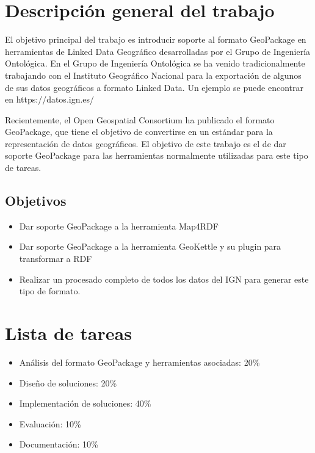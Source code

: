 \documentclass[11pt]{article}
\begin{document}
\maketitle
\tableofcontents
\newpage

\section{Descripción general del trabajo}
El objetivo principal del trabajo es introducir soporte al formato GeoPackage en herramientas de Linked Data
Geográfico desarrolladas por el Grupo de Ingeniería Ontológica.
En el Grupo de Ingeniería Ontológica se ha venido tradicionalmente trabajando con el Instituto Geográfico Nacional para la exportación de algunos de sus datos geográficos a formato Linked Data. Un ejemplo se puede encontrar en https://datos.ign.es/

Recientemente, el Open Geospatial Consortium ha publicado el formato GeoPackage, que tiene el objetivo de convertirse en un estándar para la representación de datos geográficos. El objetivo de este trabajo es el de dar soporte GeoPackage para las herramientas normalmente utilizadas para este tipo de tareas.

\subsection{Objetivos}
\begin{itemize}
    \item Dar soporte GeoPackage a la herramienta Map4RDF
    \item Dar soporte GeoPackage a la herramienta GeoKettle y su plugin para transformar a RDF
    \item Realizar un procesado completo de todos los datos del IGN para generar este tipo de formato.
\end{itemize}

\section{Lista de tareas}
\begin{itemize}
    \item Análisis del formato GeoPackage y herramientas asociadas: 20\%
    \item Diseño de soluciones: 20\%
    \item Implementación de soluciones: 40\%
    \item Evaluación: 10\%
    \item Documentación: 10\%
\end{itemize}
\end{document}

